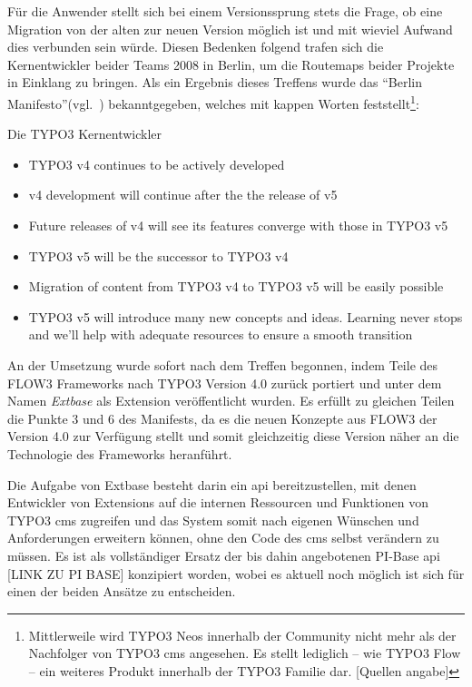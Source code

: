 Für die Anwender stellt sich bei einem Versionssprung stets die Frage, ob eine Migration von der alten zur neuen Version möglich ist und mit wieviel Aufwand dies verbunden sein würde. Diesen Bedenken folgend trafen sich die Kernentwickler beider Teams 2008 in Berlin, um die Routemaps beider Projekte in Einklang zu bringen. Als ein Ergebnis dieses Treffens wurde das ``Berlin Manifesto''(vgl.~\cite{web:berlinManifesto2008}) bekanntgegeben, welches mit kappen Worten feststellt\footnote{Mittlerweile wird TYPO3 Neos innerhalb der Community nicht mehr als der Nachfolger von TYPO3 \gls{cms} angesehen. Es stellt lediglich – wie TYPO3 Flow – ein weiteres Produkt innerhalb der TYPO3 Familie dar. [Quellen angabe]}:
\begin{shadequote}[l]{Die TYPO3 Kernentwickler}
	\begin{itemize}
		\item TYPO3 v4 continues to be actively developed
		\item v4 development will continue after the the release of v5
		\item Future releases of v4 will see its features converge with those in TYPO3 v5
		\item TYPO3 v5 will be the successor to TYPO3 v4
		\item Migration of content from TYPO3 v4 to TYPO3 v5 will be easily possible
		\item TYPO3 v5 will introduce many new concepts and ideas. Learning never stops and we'll help with adequate resources to ensure a smooth transition
	\end{itemize}
\end{shadequote}

An der Umsetzung wurde sofort nach dem Treffen begonnen, indem Teile des FLOW3 Frameworks nach TYPO3 Version 4.0 zurück portiert und unter dem Namen \emph{Extbase} als Extension veröffentlicht wurden. Es erfüllt zu gleichen Teilen die Punkte 3 und 6 des Manifests, da es die neuen Konzepte aus FLOW3 der Version 4.0 zur Verfügung stellt und somit gleichzeitig diese Version näher an die Technologie des Frameworks heranführt.

Die Aufgabe von Extbase besteht darin ein \gls{api} bereitzustellen, mit denen Entwickler von Extensions auf die internen Ressourcen und Funktionen von TYPO3 \gls{cms} zugreifen und das System somit nach eigenen Wünschen und Anforderungen erweitern können, ohne den Code des \gls{cms} selbst verändern zu müssen. Es ist als vollständiger Ersatz der bis dahin angebotenen PI-Base \gls{api} [LINK ZU PI BASE] konzipiert worden, wobei es aktuell noch möglich ist sich für einen der beiden Ansätze zu entscheiden.

